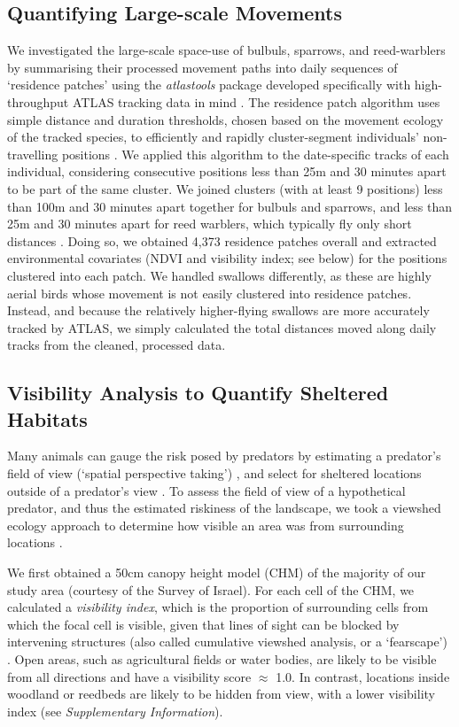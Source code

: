 \subsection*{Quantifying Large-scale Movements}

We investigated the large-scale space-use of bulbuls, sparrows, and reed-warblers by summarising their processed movement paths into daily sequences of `residence patches' using the \textit{atlastools} package developed specifically with high-throughput ATLAS tracking data in mind \citep{gupte2022d}.
The residence patch algorithm uses simple distance and duration thresholds, chosen based on the movement ecology of the tracked species, to efficiently and rapidly cluster-segment individuals' non-travelling positions \citep{gupte2022d}.
We applied this algorithm to the date-specific tracks of each individual, considering consecutive positions less than 25m and 30 minutes apart to be part of the same cluster.
We joined clusters (with at least 9 positions) less than 100m and 30 minutes apart together for bulbuls and sparrows, and less than 25m and 30 minutes apart for reed warblers, which typically fly only short distances \parencite{kiat2016}.
Doing so, we obtained 4,373 residence patches overall and extracted environmental covariates (NDVI and visibility index; see below) for the positions clustered into each patch.
We handled swallows differently, as these are highly aerial birds whose movement is not easily clustered into residence patches.
Instead, and because the relatively higher-flying swallows are more accurately tracked by ATLAS, we simply calculated the total distances moved along daily tracks from the cleaned, processed data.

\subsection*{Visibility Analysis to Quantify Sheltered Habitats}

Many animals can gauge the risk posed by predators by estimating a predator's field of view (`spatial perspective taking') \parencite{emery2000,bruce2003,davidson2016}, and select for sheltered locations outside of a predator's view \citep{hampton1994,krams2001,watve2002}.
To assess the field of view of a hypothetical predator, and thus the estimated riskiness of the landscape, we took a viewshed ecology approach to determine how visible an area was from surrounding locations \citep{aben2018,aben2021}.

We first obtained a 50cm canopy height model (CHM) \citep{aben2021} of the majority of our study area (courtesy of the Survey of Israel).
For each cell of the CHM, we calculated a \textit{visibility index}, which is the proportion of surrounding cells from which the focal cell is visible, given that lines of sight can be blocked by intervening structures (also called cumulative viewshed analysis, or a `fearscape') \parencite{olsoy2015}.
Open areas, such as agricultural fields or water bodies, are likely to be visible from all directions and have a visibility score $\approx$ 1.0.
In contrast, locations inside woodland or reedbeds are likely to be hidden from view, with a lower visibility index (see \textit{Supplementary Information}).

